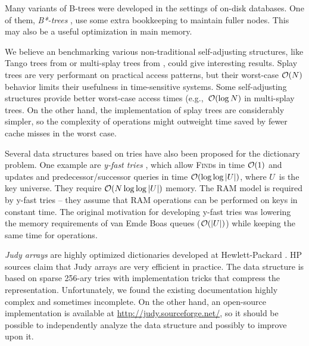 Many variants of B-trees were developed in the settings of on-disk databases.
One of them, \emph{B*-trees} \cite{bstar}, use some extra bookkeeping to
maintain fuller nodes. This may also be a useful optimization in main memory.

We believe an benchmarking various non-traditional self-adjusting structures,
like Tango trees from \cite{tango} or multi-splay trees from
\cite{multisplay-trees}, could give interesting results. Splay trees are very
performant on practical access patterns, but their worst-case $\mathcal{O}(N)$ behavior
limits their usefulness in time-sensitive systems. Some self-adjusting
structures provide better worst-case access times (e.g.,\ $\mathcal{O}(\log N)$ in
multi-splay trees. On the other hand, the implementation of splay trees
are considerably simpler, so the complexity of operations might outweight
time saved by fewer cache misses in the worst case.

Several data structures based on tries have also been proposed for the
dictionary problem. One example are \emph{y-fast tries} \cite{y-fast},
which allow \textsc{Find}s in time $\mathcal{O}(1)$ and updates and predecessor/successor
queries in time $\mathcal{O}(\log\log |U|)$, where $U$~is the key universe. They require
$\mathcal{O}(N \log\log |U|)$ memory.
The RAM model is required by y-fast tries -- they assume that RAM operations
can be performed on keys in constant time.
The original motivation for developing y-fast tries was lowering the memory
requirements of van Emde Boas queues ($\mathcal{O}(|U|)$) while keeping the same time
for operations.

\emph{Judy arrays} are highly optimized dictionaries developed at
Hewlett-Packard \cite{judy-shop-manual, judy-patent}.
HP sources claim that Judy arrays are very efficient in practice.
The data structure is based on sparse 256-ary tries with implementation tricks
that compress the representation.
Unfortunately, we found the existing documentation highly complex and sometimes
incomplete. On the other hand, an open-source implementation is available
at \url{http://judy.sourceforge.net/}, so it should be possible to independently
analyze the data structure and possibly to improve upon it.
